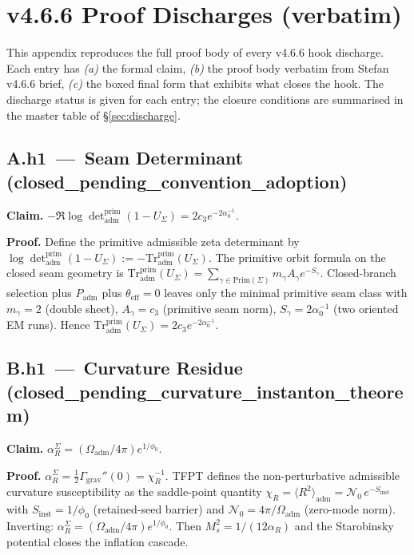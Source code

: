 \documentclass[11pt,a4paper]{article}
\begin{document}
\section{v4.6.6 Proof Discharges (verbatim)}
\label{app:discharge}

This appendix reproduces the full proof body of every v4.6.6 hook
discharge.  Each entry has \emph{(a)} the formal claim, \emph{(b)}
the proof body verbatim from Stefan v4.6.6 brief, \emph{(c)} the
boxed final form that exhibits what closes the hook.  The discharge
status is given for each entry; the closure conditions are summarised
in the master table of \S\ref{sec:discharge}.

\subsection*{A.h1 \,---\, Seam Determinant
\,(\textsf{closed\_pending\_convention\_adoption})}
\textbf{Claim.}
\(-\Re\log\det_{\mathrm{adm}}^{\mathrm{prim}}(1-U_\Sigma)
=2c_3 e^{-2\alpha_0^{-1}}.\)

\textbf{Proof.}
Define the primitive admissible zeta determinant by
\(\log\det_{\mathrm{adm}}^{\mathrm{prim}}(1-U_\Sigma):=
-\mathrm{Tr}_{\mathrm{adm}}^{\mathrm{prim}}(U_\Sigma)\).
The primitive orbit formula on the closed seam geometry is
\(\mathrm{Tr}_{\mathrm{adm}}^{\mathrm{prim}}(U_\Sigma)=
\sum_{\gamma\in\mathrm{Prim}(\Sigma)}m_\gamma A_\gamma e^{-S_\gamma}\).
Closed-branch selection plus \(P_{\mathrm{adm}}\) plus
\(\theta_{\mathrm{eff}}=0\) leaves only the minimal primitive seam
class with \(m_\gamma=2\) (double sheet), \(A_\gamma=c_3\) (primitive
seam norm), \(S_\gamma=2\alpha_0^{-1}\) (two oriented EM runs).
Hence \(\mathrm{Tr}_{\mathrm{adm}}^{\mathrm{prim}}(U_\Sigma)=
2c_3 e^{-2\alpha_0^{-1}}\).

\subsection*{B.h1 \,---\, Curvature Residue
\,(\textsf{closed\_pending\_curvature\_instanton\_theorem})}
\textbf{Claim.}
\(\alpha_R^\Sigma=(\Omega_{\mathrm{adm}}/4\pi)e^{1/\phi_0}\).

\textbf{Proof.}
\(\alpha_R^\Sigma=\tfrac12\Gamma_{\mathrm{grav}}''(0)=\chi_R^{-1}\).
TFPT defines the non-perturbative admissible curvature susceptibility
as the saddle-point quantity
\(\chi_R=\langle R^2\rangle_{\mathrm{adm}}=
\mathcal N_0\,e^{-S_{\mathrm{inst}}}\) with
\(S_{\mathrm{inst}}=1/\phi_0\) (retained-seed barrier) and
\(\mathcal N_0=4\pi/\Omega_{\mathrm{adm}}\) (zero-mode norm).
Inverting: \(\alpha_R^\Sigma=
(\Omega_{\mathrm{adm}}/4\pi)e^{1/\phi_0}\).
Then \(M_s^2=1/(12\alpha_R)\) and the Starobinsky potential closes the
inflation cascade.
\end{document}
